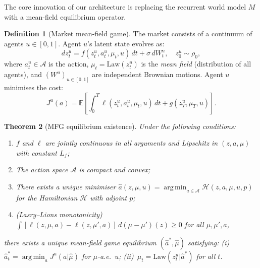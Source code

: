 \documentclass[12pt,a4paper]{article}
\theoremstyle{plain}
\newtheorem{theorem}{Theorem}[section]
\theoremstyle{definition}
\newtheorem{definition}[theorem]{Definition}
\newcommand{\E}{\mathbb{E}}
\newcommand{\A}{\mathcal{A}}
\newcommand{\Law}{\mathrm{Law}}
\newcommand{\1}{\mathbbm{1}}
\DeclareMathOperator*{\argmin}{arg\,min}
\begin{document}
The core innovation of our architecture is replacing the recurrent world
model $M$ with a mean-field equilibrium operator.

\begin{definition}[Market mean-field game]
\label{def:game}
The market consists of a continuum of agents $u \in [0,1]$. Agent $u$'s
latent state evolves as:
\begin{equation}
\label{eq:agent_sde}
dz^u_t = f(z^u_t, a^u_t, \mu_t, u)\,dt + \sigma\,dW^u_t,
\quad z^u_0 \sim \rho_0,
\end{equation}
where $a^u_t \in \A$ is the action, $\mu_t = \Law(z^u_t)$ is the
\emph{mean field} (distribution of all agents), and $(W^u)_{u\in[0,1]}$
are independent Brownian motions.  Agent $u$ minimises the cost:
\begin{equation}
\label{eq:agent_cost}
J^u(a) = \E\!\left[\int_0^T \ell(z^u_t, a^u_t, \mu_t, u)\,dt
                   + g(z^u_T, \mu_T, u)\right].
\end{equation}
\end{definition}

\begin{theorem}[MFG equilibrium existence]
\label{thm:mfg_exist}
Under the following conditions:
\begin{enumerate}[label=(\textnormal{A\arabic*})]
  \item $f$ and $\ell$ are jointly continuous in all arguments and
        Lipschitz in $(z,a,\mu)$ with constant $L_f$;
  \item The action space $\A$ is compact and convex;
  \item There exists a unique minimiser $\hat{a}(z,\mu,u) = \argmin_{a\in\A}\mathcal{H}(z,a,\mu,u,p)$
        for the Hamiltonian $\mathcal{H}$ with adjoint $p$;
  \item (\emph{Lasry--Lions monotonicity})
        $\int[\ell(z,\mu,a)-\ell(z,\mu',a)]\,d(\mu-\mu')(z) \geq 0$
        for all $\mu, \mu', a$,
\end{enumerate}
there exists a unique mean-field game equilibrium
$(\hat{a}^*, \hat{\mu})$ satisfying:
(i)~$\hat{a}^*_t = \argmin_{a}J^u(a|\hat{\mu})$ for $\mu$-a.e.\ $u$;
(ii)~$\hat{\mu}_t = \Law(z^u_t|\hat{a}^*)$ for all $t$.
\end{theorem}
\end{document}
